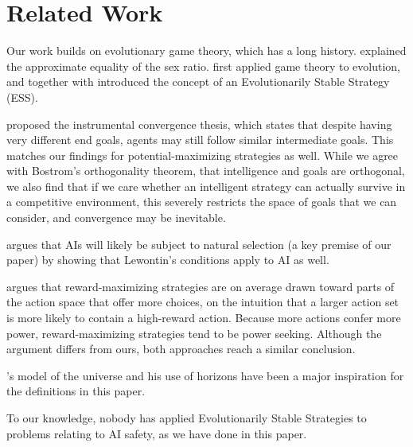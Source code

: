 \section{Related Work}
\label{sec:related}

Our work builds on evolutionary game theory, which has a long history.
\cite{fisher1930natural} explained the approximate equality of the sex ratio.
\cite{lewontin1961evolution} first applied game theory to evolution, and
\cite{smith1972game} together with \cite{smith1973logic} introduced the concept
of an Evolutionarily Stable Strategy (ESS).

\cite{bostrom2012} proposed the instrumental convergence thesis, which states that despite having
very different end goals, agents may still follow similar intermediate goals. This matches our
findings for potential-maximizing strategies as well. While we agree with Bostrom's
orthogonality theorem, that intelligence and goals are orthogonal, we also find that if we care
whether an intelligent strategy can actually survive in a competitive environment, this severely
restricts the space of goals that we can consider, and convergence may be inevitable.

\cite{hendrycks2023} argues
that AIs will likely be subject to natural selection (a key premise of our paper)
by showing that Lewontin's conditions apply to AI as well.

\cite{powerseeking} argues that reward-maximizing strategies are on average
drawn toward parts of the action space that offer more choices, on the
intuition that a larger action set is more likely to contain a high-reward
action. Because more actions confer more power, reward-maximizing strategies
tend to be power seeking. Although the argument differs from ours, both
approaches reach a similar conclusion.

\cite{Hutter:04uaibook}'s model of the universe and his use of horizons have
been a major inspiration for the definitions in this paper.

To our knowledge, nobody has applied Evolutionarily Stable Strategies to
problems relating to AI safety, as we have done in this paper.